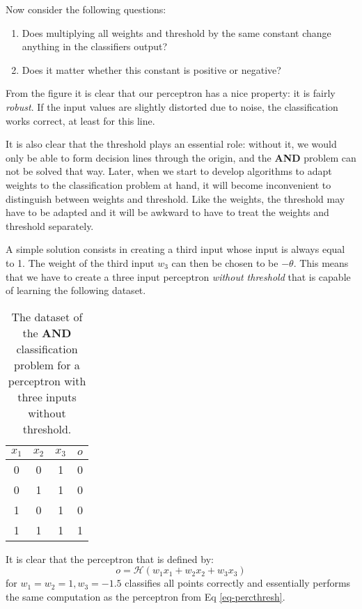 Now consider the following questions:
\begin{enumerate}
\item Does multiplying all weights and threshold by the same constant change anything in the classifiers output?
\item Does it matter whether this constant is positive or negative?
\end{enumerate}

From the figure it is clear that our perceptron has a nice property: it is fairly \emph{robust}. If the input values are slightly distorted due to noise, the classification
works correct, at least for this line.

It is also clear that the threshold plays an essential role: without it, we would only be able to form decision lines through the origin, and the {\bf AND} problem can not
be solved that way. Later, when we start to develop algorithms to adapt weights to the classification problem at hand, it will become inconvenient to distinguish
between weights and threshold. Like the weights, the threshold may have to be adapted and it will be awkward to have to treat the weights and threshold separately.


A simple solution consists in creating a third input whose input is always equal to 1. The weight of the third input $w_3$ can then be chosen to be
$-\theta$. This means that we have to create a three input perceptron \emph{without threshold} that is capable of learning the following dataset.


\begin{table}[!ht]
  \begin{center}
  \begin{tabular}{||c|c|c||c||} \hline \hline
    $x_1$ & $x_2$ & $x_3$ &$o$ \\ \hline
    0     &  0    &  1    & 0  \\
    0     &  1    &  1    & 0  \\
    1     &  0    &  1    & 0  \\
    1     &  1    &  1    & 1  \\ \hline
  \end{tabular}
  \end{center}
  \caption{The dataset of the {\bf AND} classification problem for a perceptron with three inputs without threshold.}
  \label{tab-andthreshold}
\end{table}

It is clear that the perceptron that is defined by:
$$
o = \mathcal{H}( w_1 x_1 + w_2 x_2 + w_3 x_3)
$$
for $w_1 = w_2 = 1, w_3 = -1.5$ classifies all points correctly and essentially performs the same computation as the perceptron from Eq \ref{eq-percthresh}.

